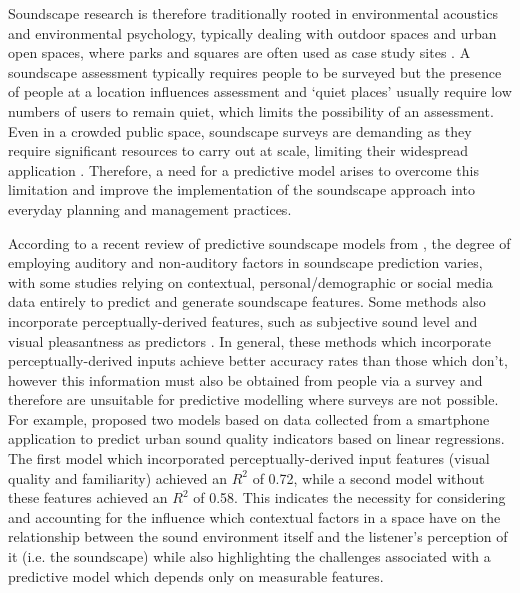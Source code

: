  Soundscape research is therefore traditionally rooted in environmental acoustics and environmental psychology, typically dealing with outdoor spaces \citep{Torresin2020Indoor} and urban open spaces, where parks and squares are often used as case study sites \citep{Kang2006Urban}. A soundscape assessment typically requires people to be surveyed but the presence of people at a location influences assessment \citep{Aletta2018Towards} and `quiet places' usually require low numbers of users to remain quiet, which limits the possibility of an assessment. Even in a crowded public space, soundscape surveys are demanding as they require significant resources to carry out at scale, limiting their widespread application \citep{Mitchell2020Soundscape}. Therefore, a need for a predictive model arises to overcome this limitation and improve the implementation of the soundscape approach into everyday planning and management practices.

 According to a recent review of predictive soundscape models from \citet{Lionello2020systematic}, the degree of employing auditory and non-auditory factors in soundscape prediction varies, with some studies relying on contextual, personal/demographic \citep{Erfanian2021Psychological,Tarlao2020Investigating} or social media \citep{Aiello2016Chatty} data entirely to predict and generate soundscape features. Some methods also incorporate perceptually-derived features, such as subjective sound level and visual pleasantness as predictors \citep{Lionello2020systematic}. In general, these methods which incorporate perceptually-derived inputs achieve better accuracy rates than those which don't, however this information must also be obtained from people via a survey and therefore are unsuitable for predictive modelling where surveys are not possible. For example, \citet{Ricciardi2015Sound} proposed two models based on data collected from a smartphone application to predict urban sound quality indicators based on linear regressions. The first model which incorporated perceptually-derived input features (visual quality and familiarity) achieved an $R^2$ of 0.72, while a second model without these features achieved an $R^2$ of 0.58. This indicates the necessity for considering and accounting for the influence which contextual factors in a space have on the relationship between the sound environment itself and the listener's perception of it (i.e. the soundscape) while also highlighting the challenges associated with a predictive model which depends only on measurable features.

